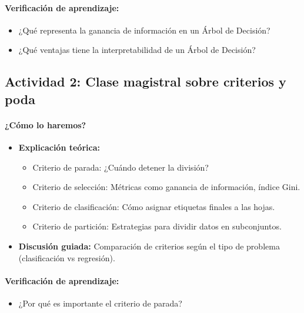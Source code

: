 \documentclass[a4,11pt]{aleph-notas}
\begin{document}
\paragraph{Verificación de aprendizaje:}  
\begin{itemize}[leftmargin=*]  
    \item ¿Qué representa la ganancia de información en un Árbol de Decisión?  
    \item ¿Qué ventajas tiene la interpretabilidad de un Árbol de Decisión?  
\end{itemize}  

\subsection*{Actividad 2: Clase magistral sobre criterios y poda}  

\paragraph{¿Cómo lo haremos?}  
\begin{itemize}[leftmargin=*]  
    \item \textbf{Explicación teórica:}  
        \begin{itemize}[leftmargin=*]  
            \item Criterio de parada: ¿Cuándo detener la división?  
            \item Criterio de selección: Métricas como ganancia de información, índice Gini.  
            \item Criterio de clasificación: Cómo asignar etiquetas finales a las hojas.  
            \item Criterio de partición: Estrategias para dividir datos en subconjuntos.  
        \end{itemize}  
    \item \textbf{Discusión guiada:} Comparación de criterios según el tipo de problema (clasificación vs regresión).  
\end{itemize}  

\paragraph{Verificación de aprendizaje:}  
\begin{itemize}[leftmargin=*]  
    \item ¿Por qué es importante el criterio de parada?  
\end{itemize}  
\end{document}
